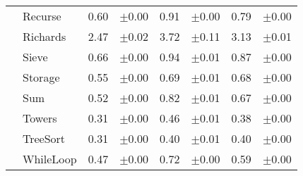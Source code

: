 \begin{tabular}{llrlrlrl}
 & Recurse & 0.60 & \scriptsize\textcolor{gray!60}{$\pm$0.00} & 0.91 & \scriptsize\textcolor{gray!60}{$\pm$0.00} & 0.79 & \scriptsize\textcolor{gray!60}{$\pm$0.00} \\
 & Richards & 2.47 & \scriptsize\textcolor{gray!60}{$\pm$0.02} & 3.72 & \scriptsize\textcolor{gray!60}{$\pm$0.11} & 3.13 & \scriptsize\textcolor{gray!60}{$\pm$0.01} \\
 & Sieve & 0.66 & \scriptsize\textcolor{gray!60}{$\pm$0.00} & 0.94 & \scriptsize\textcolor{gray!60}{$\pm$0.01} & 0.87 & \scriptsize\textcolor{gray!60}{$\pm$0.00} \\
 & Storage & 0.55 & \scriptsize\textcolor{gray!60}{$\pm$0.00} & 0.69 & \scriptsize\textcolor{gray!60}{$\pm$0.01} & 0.68 & \scriptsize\textcolor{gray!60}{$\pm$0.00} \\
 & Sum & 0.52 & \scriptsize\textcolor{gray!60}{$\pm$0.00} & 0.82 & \scriptsize\textcolor{gray!60}{$\pm$0.01} & 0.67 & \scriptsize\textcolor{gray!60}{$\pm$0.00} \\
 & Towers & 0.31 & \scriptsize\textcolor{gray!60}{$\pm$0.00} & 0.46 & \scriptsize\textcolor{gray!60}{$\pm$0.01} & 0.38 & \scriptsize\textcolor{gray!60}{$\pm$0.00} \\
 & TreeSort & 0.31 & \scriptsize\textcolor{gray!60}{$\pm$0.00} & 0.40 & \scriptsize\textcolor{gray!60}{$\pm$0.01} & 0.40 & \scriptsize\textcolor{gray!60}{$\pm$0.00} \\
 & WhileLoop & 0.47 & \scriptsize\textcolor{gray!60}{$\pm$0.00} & 0.72 & \scriptsize\textcolor{gray!60}{$\pm$0.00} & 0.59 & \scriptsize\textcolor{gray!60}{$\pm$0.00} \\
\bottomrule
\end{tabular}
